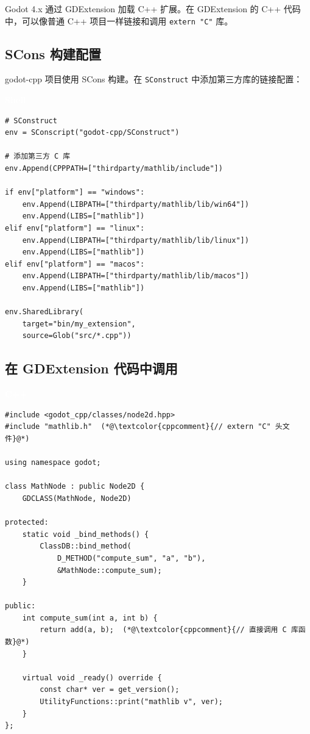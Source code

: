 \documentclass[12pt,a4paper,fontset=fandol]{ctexbook}
\newcommand{\cpplabel}{%
  \begin{tcolorbox}[enhanced,colback=cppheadbg,colframe=cppheadbg,
    arc=1mm,boxrule=0mm,left=6pt,right=6pt,top=2pt,bottom=2pt,
    halign=left,oversize]
    \textcolor{white}{\small\bfseries C++}
  \end{tcolorbox}\vspace{-4pt}}
\newcommand{\bashlabel}{%
  \begin{tcolorbox}[enhanced,colback=black!80,colframe=black!80,
    arc=1mm,boxrule=0mm,left=6pt,right=6pt,top=2pt,bottom=2pt,
    halign=left,oversize]
    \textcolor{white}{\small\bfseries Shell}
  \end{tcolorbox}\vspace{-4pt}}
\newcommand{\cpp}[1]{C++#1}
\begin{document}
Godot 4.x 通过 GDExtension 加载 \cpp{} 扩展。在 GDExtension 的 \cpp{} 代码中，可以像普通 \cpp{} 项目一样链接和调用 \texttt{extern "C"} 库。

\subsection{SCons 构建配置}

godot-cpp 项目使用 SCons 构建。在 \texttt{SConstruct} 中添加第三方库的链接配置：

\bashlabel
\begin{lstlisting}[style=bashstyle]
# SConstruct
env = SConscript("godot-cpp/SConstruct")

# 添加第三方 C 库
env.Append(CPPPATH=["thirdparty/mathlib/include"])

if env["platform"] == "windows":
    env.Append(LIBPATH=["thirdparty/mathlib/lib/win64"])
    env.Append(LIBS=["mathlib"])
elif env["platform"] == "linux":
    env.Append(LIBPATH=["thirdparty/mathlib/lib/linux"])
    env.Append(LIBS=["mathlib"])
elif env["platform"] == "macos":
    env.Append(LIBPATH=["thirdparty/mathlib/lib/macos"])
    env.Append(LIBS=["mathlib"])

env.SharedLibrary(
    target="bin/my_extension",
    source=Glob("src/*.cpp"))
\end{lstlisting}

\subsection{在 GDExtension 代码中调用}

\cpplabel
\begin{lstlisting}[style=cppstyle]
#include <godot_cpp/classes/node2d.hpp>
#include "mathlib.h"  (*@\textcolor{cppcomment}{// extern "C" 头文件}@*)

using namespace godot;

class MathNode : public Node2D {
    GDCLASS(MathNode, Node2D)

protected:
    static void _bind_methods() {
        ClassDB::bind_method(
            D_METHOD("compute_sum", "a", "b"),
            &MathNode::compute_sum);
    }

public:
    int compute_sum(int a, int b) {
        return add(a, b);  (*@\textcolor{cppcomment}{// 直接调用 C 库函数}@*)
    }

    virtual void _ready() override {
        const char* ver = get_version();
        UtilityFunctions::print("mathlib v", ver);
    }
};
\end{lstlisting}
\end{document}
